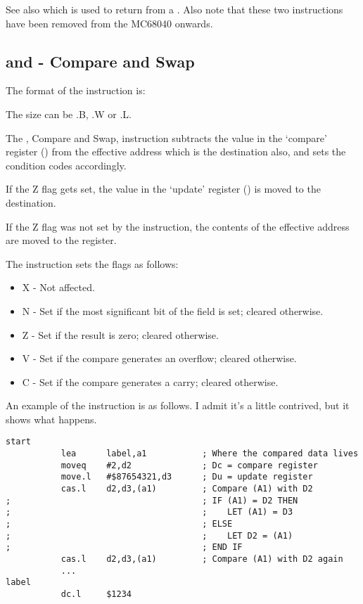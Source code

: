 See also  which is used to return from a . Also note that these two instructions have been removed from the MC68040 onwards.


\subsection{ and  - Compare and Swap}

The format of the  instruction is:


The size can be .B, .W or .L.

The , Compare and Swap, instruction subtracts the value in the `compare' register () from the effective address which is the destination also, and sets the condition codes accordingly. 

If the Z flag gets set, the value in the `update' register () is moved to the destination.

If the Z flag was not set by the instruction, the contents of the effective address are moved to the  register.

The  instruction sets the flags as follows:

\begin{itemize}
    \item X - Not affected.
    \item N - Set if the most significant bit of the field is set; cleared otherwise.
    \item Z - Set if the result is zero; cleared otherwise.
    \item V - Set if the compare generates an overflow; cleared otherwise.
    \item C - Set if the compare generates a carry; cleared otherwise.
\end{itemize}

An example of the  instruction is as follows. I admit it's a little contrived, but it shows what happens.

\begin{lstlisting}[firstnumber=1,caption={Example of the \opcode{CAS} Instruction}]
start
           lea      label,a1           ; Where the compared data lives
           moveq    #2,d2              ; Dc = compare register
           move.l   #$87654321,d3      ; Du = update register
           cas.l    d2,d3,(a1)         ; Compare (A1) with D2
;                                      ; IF (A1) = D2 THEN
;                                      ;    LET (A1) = D3
;                                      ; ELSE
;                                      ;    LET D2 = (A1)
;                                      ; END IF           
           cas.l    d2,d3,(a1)         ; Compare (A1) with D2 again
           ...		 
label
		   dc.l     $1234                    
\end{lstlisting}


